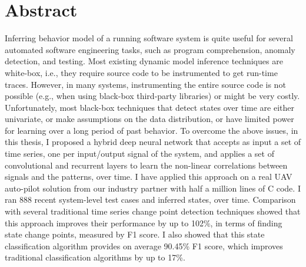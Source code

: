 
\chapter{Abstract}
Inferring behavior model of a running software system is quite useful for several automated software engineering tasks, such as program comprehension, anomaly detection, and testing. Most existing dynamic model inference techniques are white-box, i.e., they require source code to be instrumented to get run-time traces. However, in many systems, instrumenting the entire source code is not possible (e.g., when using black-box third-party libraries) or might be very costly. %
Unfortunately, most black-box techniques that detect states over time are either univariate, or make assumptions on the data distribution, or have limited power for learning over a long period of past behavior. 
To overcome the above issues, in this thesis, I proposed a hybrid deep neural network that accepts as input a set of time series, one per input/output signal of the system, and applies a set of convolutional and recurrent layers to learn the non-linear correlations between signals and the patterns, over time. 
I have applied this approach on a real UAV auto-pilot solution from our industry partner with half a million lines of C code. 
I ran 888 recent system-level test cases and inferred states, over time. 
Comparison with several traditional time series change point detection techniques showed that this approach improves their performance by up to 102\%, in terms of finding state change points, measured by F1 score. I also showed that this state classification algorithm provides on average 90.45\% F1 score, which improves traditional classification algorithms by up to 17\%.

